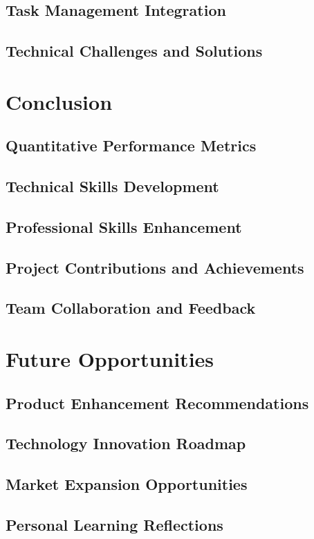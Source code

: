\documentclass[a4paper, 11pt, oneside]{report}
\begin{document}
  \section{Task Management Integration}
  \section{Technical Challenges and Solutions}
  

\chapter{Conclusion}
  \section{Quantitative Performance Metrics}
  \section{Technical Skills Development}
  \section{Professional Skills Enhancement}
  \section{Project Contributions and Achievements}
  \section{Team Collaboration and Feedback}
  

\chapter{Future Opportunities}
  \section{Product Enhancement Recommendations}
  \section{Technology Innovation Roadmap}
  \section{Market Expansion Opportunities}
  \section{Personal Learning Reflections}
\end{document}
